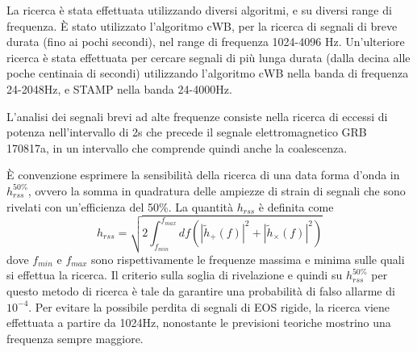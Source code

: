 La ricerca è stata effettuata utilizzando diversi algoritmi, e su diversi range di frequenza. È stato utilizzato l'algoritmo cWB, per la ricerca di segnali di breve durata (fino ai pochi secondi), nel range di frequenza 1024-4096 Hz. 
Un'ulteriore ricerca è stata effettuata per cercare segnali di più lunga durata (dalla decina alle poche centinaia di secondi) utilizzando l'algoritmo cWB nella banda di frequenza 24-2048Hz, e STAMP nella banda 24-4000Hz.

L'analisi dei segnali brevi ad alte frequenze consiste nella ricerca di eccessi di potenza nell'intervallo di 2s che precede il segnale elettromagnetico GRB 170817a, in un intervallo che comprende quindi anche la coalescenza.

È convenzione esprimere la sensibilità della ricerca di una data forma d'onda in $h_{rss}^{50\%}$, ovvero la somma in quadratura delle ampiezze di strain di segnali che sono rivelati con un'efficienza del 50\%. La quantità $h_{rss}$ è definita come
\begin{equation}
	h_{rss} = \sqrt{2\int_{f_{min}}^{f_{max}}df(|\tilde{h}_+(f)|^2 + |\tilde{h}_\times(f)|^2 )}
\end{equation}
dove $f_{min}$ e $f_{max}$ sono rispettivamente le frequenze massima e minima sulle quali si effettua la ricerca. 
Il criterio sulla soglia di rivelazione e quindi su $h_{rss}^{50\%}$ per questo metodo di ricerca è tale da garantire una probabilità di falso allarme di $10^{-4}$.
Per evitare la possibile perdita di segnali di EOS rigide, la ricerca viene effettuata a partire da 1024Hz, nonostante le previsioni teoriche mostrino una frequenza sempre maggiore.

